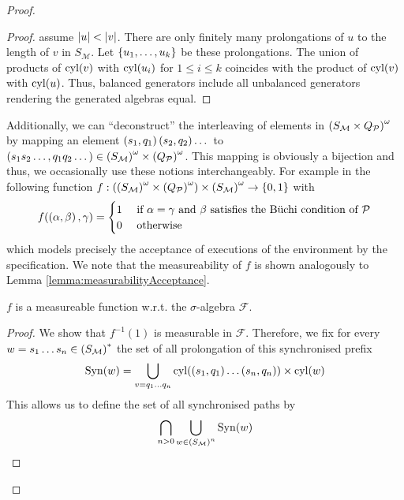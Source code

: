 \begin{proof}
\begin{proof}
  assume $\left\vert{u}\right\vert<\left\vert{v}\right\vert$. There are only finitely many prolongations of $u$
  to the length of $v$ in $S_{\mathcal{M}}$. Let $\left\{u_{1},\dots,u_{k}\right\}$ be
  these prolongations. The union of products of $\operatorname{cyl}(v)$ with $\operatorname{cyl}(u_{i})$
  for $1\leq i\leq k$ coincides with the product of $\operatorname{cyl}(v)$ with $\operatorname{cyl}(u)$.
  Thus, balanced generators include all unbalanced generators rendering the
  generated algebras equal.
\end{proof}
Additionally, we can \enquote{deconstruct} the interleaving of elements in
$\left(S_{\mathcal{M}}\times Q_{\mathcal{P}}\right)^{\omega}$ by mapping an element
$\left(s_{1},q_{1}\right)\left(s_{2},q_{2}\right)\dots$ to
$\left(s_{1}s_{2}\dots,q_{1}q_{2}\dots\right)\in
\left(S_{\mathcal{M}}\right)^{\omega}\times\left(Q_{\mathcal{P}}\right)^{\omega}$. This
mapping is obviously a bijection and thus, we occasionally use these notions
interchangeably. For example in the following function
$f:\left(\left(S_{\mathcal{M}}\right)^{\omega}\times
\left(Q_{\mathcal{P}}\right)^{\omega}\right)\times\left(S_{\mathcal{M}}\right)^{\omega}
\rightarrow\left\{0,1\right\}$ with
\begin{equation*}
  f(\left(\alpha,\beta\right),\gamma) =
  \begin{cases}
    1&\text{ if }\alpha = \gamma\text{ and }\beta
    \text{ satisfies the Büchi condition of }\mathcal{P}\\
    0&\text{ otherwise}
  \end{cases}
\end{equation*}
which models precisely the acceptance of executions of the environment by the
specification. We note that the measureability of $f$ is shown analogously to
Lemma \ref{lemma:measurabilityAcceptance}.
\begin{lemma}
  $f$ is a measureable function w.r.t. the $\sigma$-algebra $\mathcal{F}$.
\end{lemma}
\begin{proof}
  We show that $f^{-1}(1)$ is measurable in $\mathcal{F}$. Therefore, we fix
  for every $w = s_{1}\dots s_{n}\in \left(S_{\mathcal{M}}\right)^{*}$ the set of
  all prolongation of this synchronised prefix
  \begin{equation*}
    \operatorname{Syn}(w) = \bigcup_{v = q_{1}\dots q_{n}}\operatorname{cyl}(\left(s_{1},q_{1}\right)\dots
    \left(s_{n},q_{n}\right))\times\operatorname{cyl}(w)
  \end{equation*}
  This allows us to define the set of all synchronised paths by
  \begin{equation*}
    \bigcap_{n>0}\bigcup_{w\in \left(S_{\mathcal{M}}\right)^{n}}\operatorname{Syn}(w)
  \end{equation*}

\end{proof}
\end{proof}

